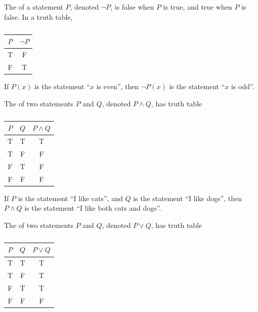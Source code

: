 \begin{definition}
    The  of a statement $P$, denoted $\lnot P$, is false when $P$ is true, and true when $P$ is false. In a truth table,
    \begin{table}[H]
        \centering
        \begin{tabular}{|c|c|}
        \hline
        $P$ & $\lnot P$ \\ \hline\hline
        T & F \\ \hline
        F & T \\ \hline
        \end{tabular}
        \caption{}
    \end{table}
\end{definition}

\begin{example}[Negation]
    If $P(x)$ is the statement ``$x$ is even'', then $\lnot P(x)$ is the statement ``$x$ is odd''.
\end{example}

\begin{definition}
    The  of two statements $P$ and $Q$, denoted $P \land Q$, has truth table
    \begin{table}[H]
        \centering
        \begin{tabular}{|c|c|c|}
        \hline
        $P$ & $Q$ & $P \land Q$ \\ \hline\hline
        T & T & T \\ \hline
        T & F & F \\ \hline
        F & T & F \\ \hline
        F & F & F \\ \hline
        \end{tabular}
        \caption{}
    \end{table}
\end{definition}

\begin{example}[Conjunction]
    If $P$ is the statement ``I like cats'', and $Q$ is the statement ``I like dogs'', then $P \land Q$ is the statement ``I like both cats and dogs''.
\end{example}

\begin{definition}
    The  of two statements $P$ and $Q$, denoted $P \lor Q$, has truth table
    \begin{table}[H]
        \centering
        \begin{tabular}{|c|c|c|}
        \hline
        $P$ & $Q$ & $P \lor Q$ \\ \hline\hline
        T & T & T \\ \hline
        T & F & T \\ \hline
        F & T & T \\ \hline
        F & F & F \\ \hline
        \end{tabular}
        \caption{}
    \end{table}
\end{definition}

